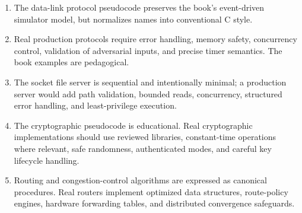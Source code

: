\documentclass[11pt]{article}
\providecommand{\tightlist}{\setlength{\itemsep}{0pt}\setlength{\parskip}{0pt}}
\begin{document}
\begin{enumerate}
\def\labelenumi{\arabic{enumi}.}
\tightlist
\item
  The data-link protocol pseudocode preserves the book's event-driven
  simulator model, but normalizes names into conventional C style.
\item
  Real production protocols require error handling, memory safety,
  concurrency control, validation of adversarial inputs, and precise
  timer semantics. The book examples are pedagogical.
\item
  The socket file server is sequential and intentionally minimal; a
  production server would add path validation, bounded reads,
  concurrency, structured error handling, and least-privilege execution.
\item
  The cryptographic pseudocode is educational. Real cryptographic
  implementations should use reviewed libraries, constant-time
  operations where relevant, safe randomness, authenticated modes, and
  careful key lifecycle handling.
\item
  Routing and congestion-control algorithms are expressed as canonical
  procedures. Real routers implement optimized data structures,
  route-policy engines, hardware forwarding tables, and distributed
  convergence safeguards.
\end{enumerate}
\end{document}
